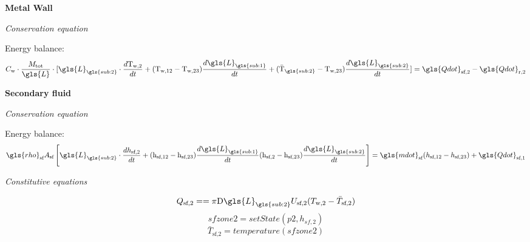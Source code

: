 \documentclass[11pt]{article} %
\begin{document}
\begin{flushleft}
{\bf Metal Wall}\\
\end{flushleft}
\begin{center}
\textit{Conservation equation}
\end{center}
Energy balance:\\
\begin{equation}
C_\text{w} \cdot \frac{M_\text{tot}}{\gls{L}} \cdot [\gls{L}_{\gls{sub:2}} \cdot  \frac{d \text{T}_\text{w,2}}{d t} +  (\text{T}_\text{w,12} - \text{T}_\text{w,23})  \frac{d \gls{L}_{\gls{sub:1}}}{d t} +  (\bar{\text{T}}_{\gls{sub:2}} - \text{T}_\text{w,23})  \frac{d \gls{L}_{\gls{sub:2}}}{d t}] = \gls{Qdot}_\text{sf,2} - \gls{Qdot}_\text{r,2}
\end{equation}

\begin{flushleft}
{\bf Secondary fluid}\\
\end{flushleft}
\begin{center}
\textit{Conservation equation}
\end{center}
Energy balance:
\begin{equation}
\gls{rho}_\text{sf} A_\text{sf} \left[\gls{L}_{\gls{sub:2}} \cdot  \frac{d h_\text{sf,2}}{d t} +  (\text{h}_\text{sf,12} - \text{h}_\text{sf,23})  \frac{d \gls{L}_{\gls{sub:1}}}{d t} (\text{h}_\text{sf,2} - \text{h}_\text{sf,23})  \frac{d \gls{L}_{\gls{sub:2}}}{d t}\right] = \gls{mdot}_\text{sf} ({h}_\text{sf,12} - h_\text{sf,23} ) + \gls{Qdot}_\text{sf,1} 
\end{equation}
\begin{center}
\textit{Constitutive equations}
\end{center}

\begin{equation}
{Q}_\text{sf,2} = = \pi \text{D} \gls{L}_{\gls{sub:2}} U_\text{sf,2} (T_\text{w,2} - \bar{T}_\text{sf,2})
\end{equation}
\begin{equation}
sfzone2 = setState(p2,h_{sf,2})
\end{equation}
\begin{equation}
\bar{T}_\text{sf,2} = temperature(sfzone2)
\end{equation}\\
\end{document}
